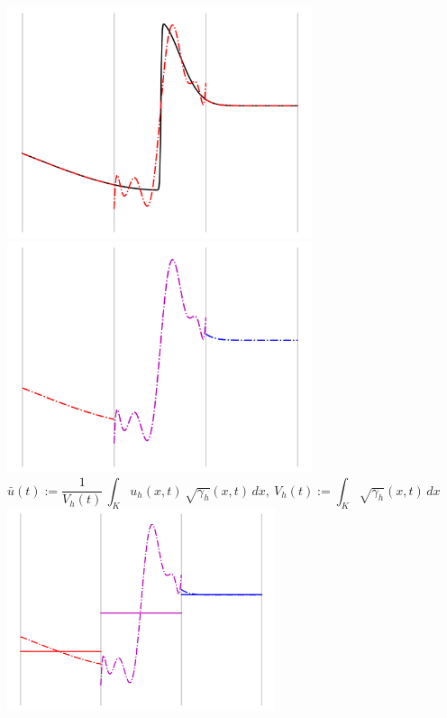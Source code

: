 \documentclass{beamer}
\begin{document}
\begin{frame}
\begin{figure}
\begin{overprint}
        \centering\includegraphics[width=0.8\textwidth]{./fig.sl_01.png}
        \centering\includegraphics[width=0.8\textwidth]{./fig.sl_02.png}
        $$\bar{u}\left(t\right)
        := \frac{1}{V_{h}\left(t\right)} \,
        \int_{K} u_{h}\left(x,t\right) \,
        \sqrt{\gamma_{h}}\left(x,t\right) \, dx,
        \ V_{h}\left(t\right)
        := \int_{K} \sqrt{\gamma_{h}}\left(x,t\right) \, dx$$
        \centering\includegraphics[width=0.7\textwidth]{./fig.sl_03.png}

\end{overprint}
\end{figure}
\end{frame}
\end{document}
